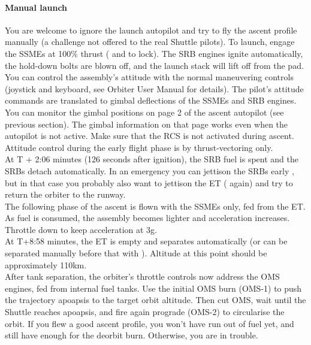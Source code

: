 \documentclass[Orbiter User Manual.tex]{subfiles}
\begin{document}
\paragraph{Manual launch}
You are welcome to ignore the launch autopilot and try to fly the ascent profile manually (a challenge not offered to the real Shuttle pilots). To launch, engage the SSMEs at 100\% thrust ( and  to lock). The SRB engines ignite automatically, the hold-down bolts are blown off, and the launch stack will lift off from the pad. You can control the assembly's attitude with the normal maneuvering controls (joystick and keyboard, see Orbiter User Manual for details). The pilot's attitude commands are translated to gimbal deflections of the SSMEs and SRB engines. You can monitor the gimbal positions on page 2 of the ascent autopilot (see previous section). The gimbal information on that page works even when the autopilot is not active. Make sure that the RCS is not activated during ascent. Attitude control during the early flight phase is by thrust-vectoring only.\\

At T + 2:06 minutes (126 seconds after ignition), the SRB fuel is spent and the SRBs detach automatically. In an emergency you can jettison the SRBs early , but in that case you probably also want to jettison the ET ( again) and try to return the orbiter to the runway.\\

The following phase of the ascent is flown with the SSMEs only, fed from the ET. As fuel is consumed, the assembly becomes lighter and acceleration increases. Throttle down to keep acceleration at 3g.\\

At T+8:58 minutes, the ET is empty and separates automatically (or can be separated manually before that with ). Altitude at this point should be approximately 110km.\\

After tank separation, the orbiter's throttle controls now address the OMS engines, fed from internal fuel tanks. Use the initial OMS burn (OMS-1) to push the trajectory apoapsis to the target orbit altitude. Then cut OMS, wait until the Shuttle reaches apoapsis, and fire again prograde (OMS-2) to circularise the orbit. If you flew a good ascent profile, you won't have run out of fuel yet, and still have enough for the deorbit burn. Otherwise, you are in trouble.\\
\end{document}
